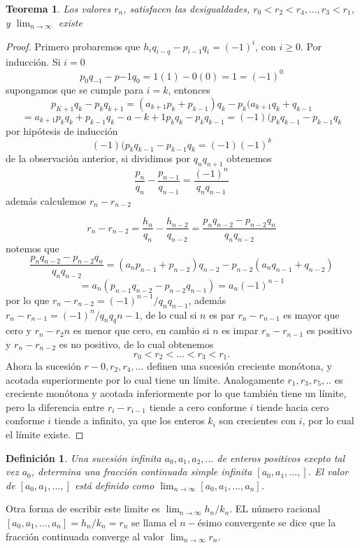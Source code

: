 \documentclass[11pt, article]{article}
\newtheorem{theorem}{Teorema} %
\newtheorem{definition}{Definición}
\begin{document}
    \begin{theorem}
    Los valores $r_n$, satisfacen las desigualdades, $r_0<r_2<r_4,...,r_3<r_1$, y $\lim_{n\to\infty}$ existe 
    \end{theorem}
    \begin{proof}
        Primero probaremos que $h_iq_{i-q}-p_{i-1}q_{i}=(-1)^i$, con $i\geq 0$.
    Por inducción. Si $i=0$
        \[
        p_0q_{-1}-p{-1}q_0=1(1)-0(0)=1=(-1)^0
        \]
    supongamos que se cumple para $i=k$, entonces
    \[
    p_{K+1}q_{k}-p_{k}q_{k+1}=(a_{k+1}p_{k} + p_{k-1})q_k-p_k(a_{k+1}q_k+q_{k-1}
    \]
    \[
    =a_{k+1}p_kq_k+p_{k-1}q_k-a-{k+1}p_kq_k-p_kq_{k-1}
    =(-1)(p_kq_{k-1}-p_{k-1}q_k
    \]
    por hipótesis de inducción 
        \[
        (-1)(p_kq_{k-1}-p_{k-1}q_k=(-1)(-1)^k
        \]
    de la observación anterior, si dividimos por $q_nq_{n+1}$ obtenemos 
        \[
        \dfrac{p_n}{q_n}-\dfrac{p_{n-1}}{q_{n-1}}=\dfrac{(-1)^n}{q_nq_{n-1}}
        \]
    además calculemos $r_n-r_{n-2}$
    
        \[
        r_n-r_{n-2}=\dfrac{h_n}{q_n}-\dfrac{h_{n-2}}{q_{n-2}}=\dfrac{p_nq_{n-2}-p_{n-2}q_n}{q_nq_{n-2}}
        \]
        notemos que 
        \[
        \dfrac{p_nq_{n-2}-p_{n-2}q_n}{q_nq_{n-2}}=(a_n p_{n-1}+p_{n-2})q_{n-2}-p_{n-2}(a_n q_{n-1}+q_{n-2})
        \]
        \[
        =a_n(p_{n-1}q_{n-2}-p_{n-2}q_{n-1})=a_n(-1)^{n-1}
        \]
    por lo que $r_n-r_{n-2}=(-1)^{n-1}/q_nq_{n-1}$, además $r_n-r_{n-1}=(-1)^n/q_nq_q{n-1}$, de lo cual si $n$ es par $r_n-r_{n-1}$ es mayor que cero y $r_n-r_2n$ es menor que cero, en cambio si $n$ es impar $r_n-r_{n-1}$ es positivo y $r_n-r_{n-2}$ es no positivo, de lo cual obtenemos
    \[
    r_0<r_2<...<r_3<r_1.
    \]
    Ahora la sucesión $r-0,r_2,r_4,...$ definen una sucesión creciente monótona, y acotada superiormente por lo cual tiene un límite. Analogamente $r_1,r_3,r_5,..$ es creciente monótona y acotada inferiormente por lo que también tiene un límite, pero la diferencia entre $r_i-r_{i-1}$ tiende a cero conforme $i$ tiende hacia cero conforme $i$ tiende a infinito, ya que los enteros $k_i$ son crecientes con $i$, por lo cual el límite existe. 
    \end{proof}
    \begin{definition}
    Una sucesión infinita $a_0, a_1, a_2,...$ de enteros positivos exepto tal vez $a_0$, determina una fracción continuada simple infinita $[a_0, a_1, ..., ]$. El valor de $[a_0, a_1, ..., ]$ está definido como $\lim_{n\to\infty}[a_0, a_1, ..., a_n]$.
    \end{definition}  
    Otra forma de escribir este limite es $\lim_{n\to\infty} h_n/k_n$. EL número racional $[a_0, a_1, ...,a_n]=h_n/k_n=r_n$ se llama el $n-$ésimo convergente se dice que la fracción continuada converge al valor $\lim_{n\to\infty}r_n$.
\end{document}

